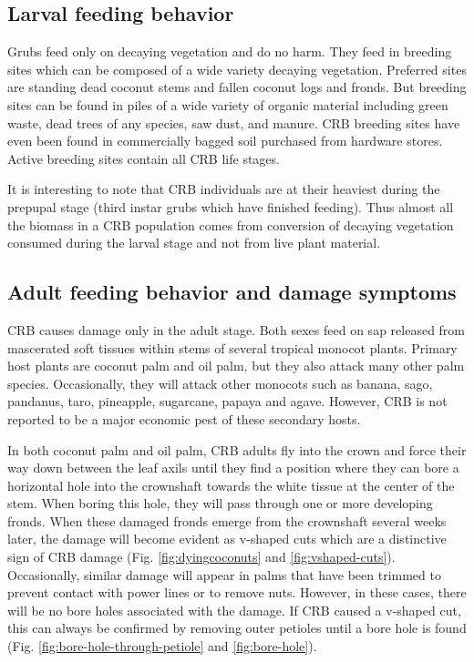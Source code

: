 \documentclass[twocolumn,letterpaper]{scrartcl}
\begin{document}
\subsection{Larval feeding behavior}

Grubs feed only on decaying vegetation and do no harm. They feed in breeding sites which can be composed of a wide variety decaying vegetation. Preferred sites are standing dead coconut stems and fallen coconut logs and fronds. But breeding sites can be found in piles of a wide variety of organic material including green waste, dead trees of any species, saw dust, and manure. CRB breeding sites have even been found in commercially bagged soil purchased from  hardware stores. Active breeding sites contain all CRB life stages.

It is interesting to note that CRB individuals are at their heaviest during the prepupal stage (third instar grubs which have finished feeding). Thus almost all the biomass in a CRB population comes from conversion of decaying vegetation consumed during the larval stage and not from live plant material.

\subsection{Adult feeding behavior and damage symptoms}

CRB causes damage only in the adult stage. Both sexes feed on sap released from mascerated soft tissues within stems of several tropical monocot plants. Primary host plants are coconut palm and oil palm, but they also attack many other palm species.  Occasionally, they will attack other monocots such as banana, sago, pandanus, taro, pineapple, sugarcane, papaya and agave. However, CRB is not reported to be a major economic pest of these secondary hosts.

In both coconut palm and oil palm, CRB adults fly into the crown and force their way down between the leaf axils until they find a position where they can bore a horizontal hole into the crownshaft towards the white tissue at the center of the stem. When boring this hole, they will pass through one or more developing fronds. When these damaged fronds emerge from the crownshaft several weeks later, the damage will become evident as v-shaped cuts which are a distinctive sign of CRB damage (Fig. \ref{fig:dyingcoconuts} and \ref{fig:vshaped-cuts}). Occasionally, similar damage will appear in palms that have been trimmed to prevent contact with power lines or to remove nuts. However, in these cases, there will be no bore holes associated with the damage. If CRB caused a v-shaped cut, this can always be confirmed by removing outer petioles until a bore hole is found (Fig. \ref{fig:bore-hole-through-petiole} and \ref{fig:bore-hole}).
\end{document}

